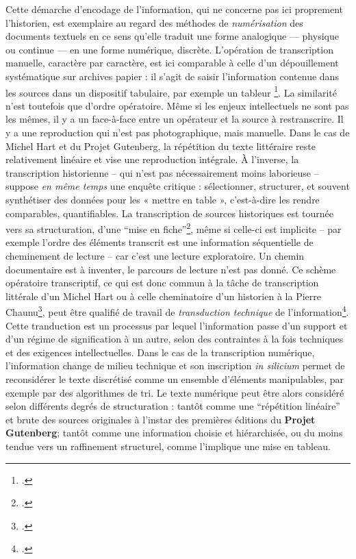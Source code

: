 Cette démarche d'encodage de l'information, qui ne concerne pas ici proprement l’historien, est exemplaire au regard des méthodes de \emph{numérisation} des documents textuels en ce sens qu’elle traduit une forme analogique — physique ou continue — en une forme numérique, discrète. L’opération de transcription manuelle, caractère par caractère, est ici comparable à celle d’un dépouillement systématique sur archives papier : il s’agit de saisir l’information contenue dans les sources dans un dispositif tabulaire, par exemple un tableur \footcite[][]{zalc}. La similarité n’est toutefois que d’ordre opératoire. Même si les enjeux intellectuels ne sont pas les mêmes, il y a un face-à-face entre un opérateur et la source à restranscrire. Il y a une reproduction qui n'est pas photographique, mais manuelle. Dans le cas de Michel Hart et du Projet Gutenberg, la répétition du texte littéraire reste relativement linéaire et vise une reproduction intégrale. À l’inverse, la transcription historienne -- qui n'est pas nécessairement moins laborieuse -- suppose \emph{en même temps} une enquête critique : sélectionner, structurer, et souvent synthétiser des données pour les « mettre en table », c’est-à-dire les rendre comparables, quantifiables. La transcription de sources historiques est tournée vers sa structuration, d'une \enquote{mise en fiche}\footcite[][]{bertfiche}, même si celle-ci est implicite -- par exemple l'ordre des éléments transcrit est une information séquentielle de cheminement de lecture -- car c'est une lecture exploratoire. Un chemin documentaire est à inventer, le parcours de lecture n'est pas donné. Ce schème opératoire transcriptif, ce qui est donc commun à la tâche de transcription littérale d'un Michel Hart ou à celle cheminatoire d'un historien à la Pierre Chaunu\footcite[][]{muller}, peut être qualifié de travail de \emph{transduction technique} de l'information\footcite[][p. 76]{chatonsky}. Cette tranduction est un processus par lequel l’information passe d’un support et d’un régime de signification à un autre, selon des contraintes à la fois techniques et des exigences intellectuelles. Dans le cas de la transcription numérique, l'information change de milieu technique et son inscription \emph{in silicium} permet de reconsidérer le texte discrétisé comme un ensemble d'éléments manipulables, par exemple par des algorithmes de tri. Le texte numérique peut être alors considéré selon différents degrés de structuration : tantôt comme une \enquote{répétition linéaire} et brute des sources originales à l'instar des premières éditions du \textbf{Projet Gutenberg}; tantôt comme une information choisie et hiérarchisée, ou du moins tendue vers un raffinement structurel, comme l'implique une mise en tableau.

